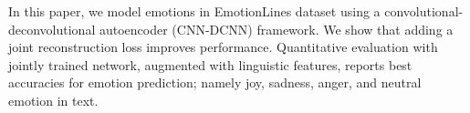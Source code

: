 In this paper, we model emotions in EmotionLines dataset using a convolutional-deconvolutional autoencoder (CNN-DCNN) framework. We show that adding a joint reconstruction loss improves performance. Quantitative evaluation with jointly trained network, augmented with linguistic features, reports best accuracies for emotion prediction; namely joy, sadness, anger, and neutral emotion in text.

